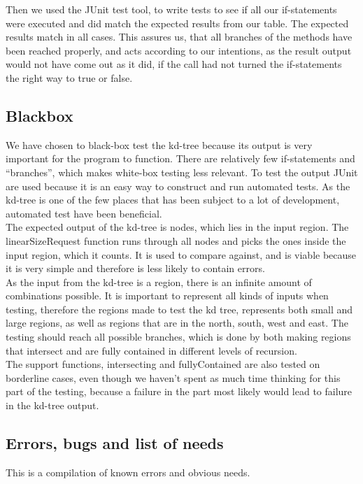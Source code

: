 \documentclass[a4paper,10pt,titlepage]{article}
\begin{document}
Then we used the JUnit test tool, to write tests to see if all our if-statements were executed and did match the expected results from our table. The expected results match in all cases. This assures us, that all branches of the methods have been reached properly, and acts according to our intentions, as the result output would not have come out as it did, if the call had not turned the if-statements the right way to true or false.


		\subsection{Blackbox}
		We have chosen to black-box test the kd-tree because its output is very important for the program to function. There are relatively few if-statements and “branches”, which makes white-box testing less relevant.
To test the output JUnit are used because it is an easy way to construct and run automated tests. As the kd-tree is one of the few places that has been subject to a lot of development, automated test have been beneficial.\\The expected output of the kd-tree is nodes, which lies in the input region. The linearSizeRequest function runs through all nodes and picks the ones inside the input region, which it counts. It is used to compare against, and is viable because it is very simple and therefore is less likely to contain errors.\\
As the input from the kd-tree is a region, there is an infinite amount of combinations possible. It is important to represent all kinds of inputs when testing, therefore the regions made to test the kd tree, represents both small and large regions, as well as regions that are in the north, south, west and east. The testing should reach all possible branches, which is done by both making regions that intersect and are fully contained in different levels of recursion.\\
The support functions, intersecting and fullyContained are also tested on borderline cases, even though we haven’t spent as much time thinking for this part of the testing, because a failure in the part most likely would lead to failure in the kd-tree output.\\

			
		\subsection{Errors, bugs and list of needs}
		This is a compilation of known errors and obvious needs.
\end{document}

